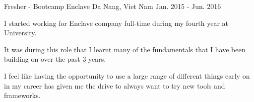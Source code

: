 \begin{cventries}
  \cventry
    {Fresher - Bootcamp} %
    {Enclave} %
    {Da Nang, Viet Nam} %
    {Jan. 2015 - Jun. 2016} %
    {
      \begin{cvitems} %
        \item {I started working for Enclave company full-time during my fourth year at University.}
        \item {It was during this role that I learnt many of the fundamentals that I have been building on over the past 3 years.}
        \item {I feel like having the opportunity to use a large range of different things early on in my career has given me the drive to always want to try new tools and frameworks.}
      \end{cvitems}
    }

\end{cventries}
